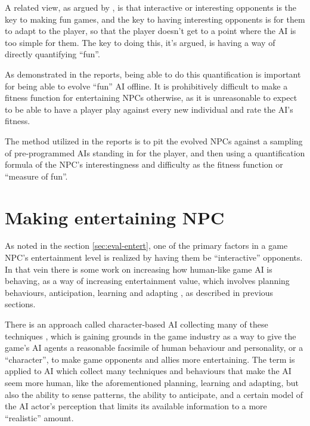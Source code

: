 \documentclass[]{report}
\begin{document}
A related view, as argued by
\citet{yannakakis2004interactive,yannakakis2004evolving}, is that interactive or
interesting opponents is the key to making fun games, and the key to having
interesting opponents is for them to adapt to the player, so that the player
doesn't get to a point where the AI is too simple for them. The key to doing
this, it's argued, is having a way of directly quantifying ``fun''.

As demonstrated in the reports, being able to do this quantification is
important for being able to evolve ``fun'' AI offline. It is prohibitively
difficult to make a fitness function for entertaining NPCs otherwise, as it is
unreasonable to expect to be able to have a player play against every new
individual and rate the AI's fitness.

The method utilized in the reports is to pit the evolved NPCs against a sampling
of pre-programmed AIs standing in for the player, and then using a
quantification formula of the NPC's interestingness and difficulty as the
fitness function or ``measure of fun''.

\section{Making entertaining NPC}
\label{sec:making-entert-npc}

As noted in the section \ref{sec:eval-entert}, one of the primary factors in a game NPC's
entertainment level is realized by having them be ``interactive'' opponents.
In that vein there is some work on increasing how human-like game AI is
behaving, as a way of increasing entertainment value, which involves planning
behaviours, anticipation, learning and adapting
\citep{orkin2004symbolic,orkin2003applying,
  yannakakis2009real,spronck2005adaptive}, as described in previous sections.

There is an approach called character-based AI collecting many of these
techniques \citep[][]{isla2002new}, which is gaining grounds in the game
industry as a way to give the game's AI agents a reasonable facsimile of human
behaviour and personality, or a ``character'', to make game opponents and allies
more entertaining. The term is applied to AI which collect many techniques and
behaviours that make the AI seem more human, like the aforementioned planning,
learning and adapting, but also the ability to sense patterns, the ability to
anticipate, and a certain model of the AI actor's perception that limits its
available information to a more ``realistic'' amount.
\end{document}
